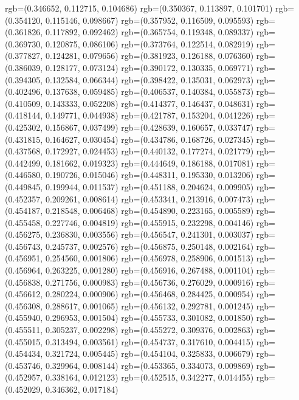 {{{					rgb=(0.346652, 0.112715, 0.104686)
					rgb=(0.350367, 0.113897, 0.101701)
					rgb=(0.354120, 0.115146, 0.098667)
					rgb=(0.357952, 0.116509, 0.095593)
					rgb=(0.361826, 0.117892, 0.092462)
					rgb=(0.365754, 0.119348, 0.089337)
					rgb=(0.369730, 0.120875, 0.086106)
					rgb=(0.373764, 0.122514, 0.082919)
					rgb=(0.377827, 0.124281, 0.079656)
					rgb=(0.381923, 0.126188, 0.076360)
					rgb=(0.386039, 0.128177, 0.073124)
					rgb=(0.390172, 0.130335, 0.069771)
					rgb=(0.394305, 0.132584, 0.066344)
					rgb=(0.398422, 0.135031, 0.062973)
					rgb=(0.402496, 0.137638, 0.059485)
					rgb=(0.406537, 0.140384, 0.055873)
					rgb=(0.410509, 0.143333, 0.052208)
					rgb=(0.414377, 0.146437, 0.048631)
					rgb=(0.418144, 0.149771, 0.044938)
					rgb=(0.421787, 0.153204, 0.041226)
					rgb=(0.425302, 0.156867, 0.037499)
					rgb=(0.428639, 0.160657, 0.033747)
					rgb=(0.431815, 0.164627, 0.030454)
					rgb=(0.434786, 0.168726, 0.027345)
					rgb=(0.437568, 0.172927, 0.024453)
					rgb=(0.440132, 0.177274, 0.021779)
					rgb=(0.442499, 0.181662, 0.019323)
					rgb=(0.444649, 0.186188, 0.017081)
					rgb=(0.446580, 0.190726, 0.015046)
					rgb=(0.448311, 0.195330, 0.013206)
					rgb=(0.449845, 0.199944, 0.011537)
					rgb=(0.451188, 0.204624, 0.009905)
					rgb=(0.452357, 0.209261, 0.008614)
					rgb=(0.453341, 0.213916, 0.007473)
					rgb=(0.454187, 0.218548, 0.006468)
					rgb=(0.454890, 0.223165, 0.005589)
					rgb=(0.455458, 0.227746, 0.004819)
					rgb=(0.455915, 0.232298, 0.004146)
					rgb=(0.456275, 0.236830, 0.003556)
					rgb=(0.456547, 0.241301, 0.003037)
					rgb=(0.456743, 0.245737, 0.002576)
					rgb=(0.456875, 0.250148, 0.002164)
					rgb=(0.456951, 0.254560, 0.001806)
					rgb=(0.456978, 0.258906, 0.001513)
					rgb=(0.456964, 0.263225, 0.001280)
					rgb=(0.456916, 0.267488, 0.001104)
					rgb=(0.456838, 0.271756, 0.000983)
					rgb=(0.456736, 0.276029, 0.000916)
					rgb=(0.456612, 0.280224, 0.000906)
					rgb=(0.456468, 0.284425, 0.000954)
					rgb=(0.456308, 0.288617, 0.001065)
					rgb=(0.456132, 0.292781, 0.001245)
					rgb=(0.455940, 0.296953, 0.001504)
					rgb=(0.455733, 0.301082, 0.001850)
					rgb=(0.455511, 0.305237, 0.002298)
					rgb=(0.455272, 0.309376, 0.002863)
					rgb=(0.455015, 0.313494, 0.003561)
					rgb=(0.454737, 0.317610, 0.004415)
					rgb=(0.454434, 0.321724, 0.005445)
					rgb=(0.454104, 0.325833, 0.006679)
					rgb=(0.453746, 0.329964, 0.008144)
					rgb=(0.453365, 0.334073, 0.009869)
					rgb=(0.452957, 0.338164, 0.012123)
					rgb=(0.452515, 0.342277, 0.014455)
					rgb=(0.452029, 0.346362, 0.017184)
}}}
